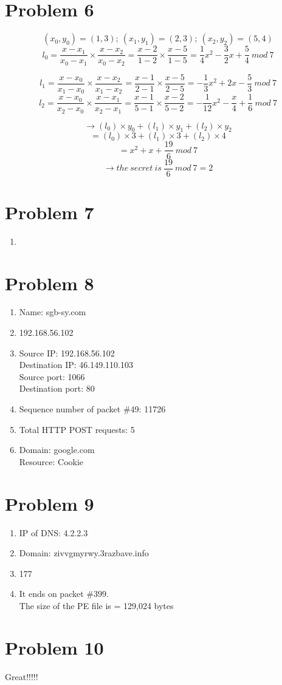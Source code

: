 \documentclass[11pt]{article}
\newenvironment{qparts}{\begin{enumerate}[{(}a{)}]}{\end{enumerate}}
\begin{document}
\newpage
\section*{Problem 6}
$$(x_0,y_0) = (1,3);\ (x_1,y_1) = (2,3);\ (x_2,y_2) = (5,4) $$
$$l_0 = \frac{x-x_1}{x_0 - x_1} \times \frac{x-x_2}{x_0 - x_2} = \frac{x-2}{1-2} \times \frac{x-5}{1-5} = \frac{1}{4}x^2 - \frac{3}{2}x + \frac{5}{4}\ mod\ 7$$

$$l_1 = \frac{x-x_0}{x_1 - x_0} \times \frac{x-x_2}{x_1 - x_2} = \frac{x-1}{2-1} \times \frac{x-5}{2-5} = -\frac{1}{3}x^2 + 2x - \frac{5}{3}\ mod\ 7$$
$$l_2 = \frac{x-x_0}{x_2 - x_0} \times \frac{x-x_1}{x_2 - x_1} = \frac{x-1}{5-1} \times \frac{x-2}{5-2} = -\frac{1}{12}x^2 - \frac{x}{4}  + \frac{1}{6}\ mod\ 7$$

$$\rightarrow (l_0)\times y_0 + (l_1) \times y_1 + (l_2)\times y_2$$
$$= (l_0)\times 3 + (l_1)\times 3 + (l_2)\times 4$$
$$= x^2 + x + \frac{19}{6}\ mod\ 7$$
$$\rightarrow the\ secret\ is\ \frac{19}{6}\ mod\ 7 = \boxed{2}$$


\newpage
\section*{Problem 7}
\begin{qparts}
\item
\end{qparts}




\newpage
\section*{Problem 8}
\begin{qparts}
\item
Name: sgb-sy.com
\item
192.168.56.102
\item
Source IP: 192.168.56.102\\
Destination IP: 46.149.110.103\\
Source port: 1066\\
Destination port: 80
\item
Sequence number of packet $\#$49: 11726
\item
Total HTTP POST requests: 5
\item
Domain: google.com\\
Resource: Cookie\\


\end{qparts}

\newpage
\section*{Problem 9}
\begin{qparts}
\item
IP of DNS: 4.2.2.3
\item
Domain: zivvgmyrwy.3razbave.info
\item
177
\item
It ends on packet $\#399$.\\
The size of the PE file is = 129,024 bytes

\end{qparts}
\newpage
\section*{Problem 10}
Great!!!!!
\end{document}
